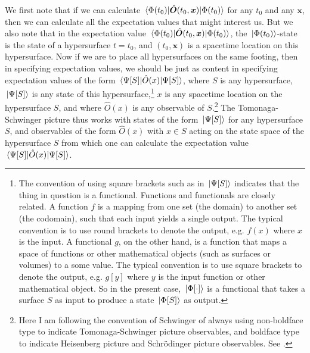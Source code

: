 We first note that if we can calculate $\ev*{\hat{\bm{O}}(t_0,\bm{x})}{\Phi(t_0)}$ for any $t_0$ and any $\bm{x}$, then we can calculate all the expectation values that might interest us. But we also note that in the expectation value $\ev*{\hat{\bm{O}}(t_0,\bm{x})}{\Phi(t_0)}$,  the $\ket*{\Phi(t_0)}$-state is the state of a hypersurface $t=t_0$, and $(t_0,\bm{x})$ is a spacetime location on this hypersurface. Now if we are to place all hypersurfaces on the same footing, then in specifying expectation values, we should be just as content in specifying expectation values of the form $\ev*{\hat{O}(x)}{\Psi[S]}$, where $S$ is any hypersurface, $\ket*{\Psi[S]}$ is any state of this hypersurface,\footnote{The convention of using square brackets such as in $\ket*{\Psi[S]}$ indicates that the thing in question is a functional. Functions and functionals are closely related. A function $f$ is a mapping from one set (the domain) to another set (the codomain), such that each input yields a single output. The typical convention is to use round brackets to denote the output, e.g. $f(x)$ where $x$ is the input. A functional $g$, on the other hand, is a function that maps a space of functions or other mathematical objects (such as surfaces or volumes) to a some value. The typical convention is to use square brackets to denote the output, e.g. $g[y]$ where $y$ is the input function or other mathematical object. So in the present case, $\ket*{\Phi[\cdot]}$ is a functional that takes a surface $S$ as input to produce a state $\ket*{\Phi[S]}$ as output.} $x$ is any spacetime location on the hypersurface $S$, and where $\hat{O}(x)$ is any observable of $S$.\footnote{\label{boldref}Here I am following the convention of Schwinger of always using non-boldface type to indicate Tomonaga-Schwinger picture observables, and boldface type to indicate Heisenberg picture and Schr\"{o}dinger picture observables. See \cite[p. 1448]{SchwingerJulianI}.} The Tomonaga-Schwinger picture thus works with states of the form $\ket*{\Psi[S]}$ for any hypersurface $S$, and observables of the form $\hat{O}(x)$ with $x\in S$ acting on the state space of the hypersurface $S$ from which one can calculate the expectation value $\ev*{\hat{O}(x)}{\Psi[S]}$.

